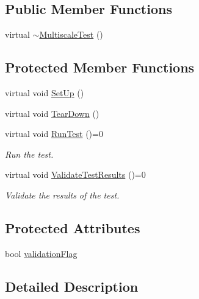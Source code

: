 \subsection*{\-Public \-Member \-Functions}
\begin{DoxyCompactItemize}
\item 
virtual \hyperlink{classmultiscaletest_1_1MultiscaleTest_a27aa0fd218670e2265edad84b2fb1f8f}{$\sim$\-Multiscale\-Test} ()
\end{DoxyCompactItemize}
\subsection*{\-Protected \-Member \-Functions}
\begin{DoxyCompactItemize}
\item 
virtual void \hyperlink{classmultiscaletest_1_1MultiscaleTest_ae2aca36167fd45b7ad41a62959fa2d7b}{\-Set\-Up} ()
\item 
virtual void \hyperlink{classmultiscaletest_1_1MultiscaleTest_a189153640670abf1819ae8d71899aa94}{\-Tear\-Down} ()
\item 
virtual void \hyperlink{classmultiscaletest_1_1MultiscaleTest_a3b3c62b74e1fd1eb0633f9b720659ce3}{\-Run\-Test} ()=0
\begin{DoxyCompactList}\small\item\em \-Run the test. \end{DoxyCompactList}\item 
virtual void \hyperlink{classmultiscaletest_1_1MultiscaleTest_a571838b9aa291a62da67733e39268871}{\-Validate\-Test\-Results} ()=0
\begin{DoxyCompactList}\small\item\em \-Validate the results of the test. \end{DoxyCompactList}\end{DoxyCompactItemize}
\subsection*{\-Protected \-Attributes}
\begin{DoxyCompactItemize}
\item 
bool \hyperlink{classmultiscaletest_1_1MultiscaleTest_a0a15b3e8510007c85ca5af092c248c9c}{validation\-Flag}
\end{DoxyCompactItemize}


\subsection{\-Detailed \-Description}


